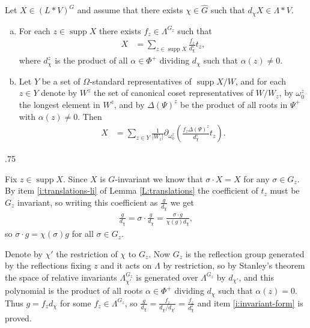 \documentclass[11pt,fleqn]{amsart}
\makeatletter
\renewcommand\proofname{Proof}
\renewenvironment{proof}[1][\textit{\proofname}]{\par
 \pushQED{\qed}%
 \normalfont \topsep.75\paraskip\relax
 \trivlist
 \item[\hskip\labelsep
 \itshape
 #1\@addpunct{.}]\ignorespaces
}{%
 \popQED\endtrivlist\@endpefalse
}
\newcounter{para}[section]
\DeclareMathOperator\supp{supp}
\makeatother
\begin{document}
\begin{Proposition}
\label{P:form}
Let $X \in (L*V)^G$ and assume that there exists $\chi \in \hat G$ such that 
$d_\chi X \in \Lambda * V$. 
\begin{enumerate}[(a)]
\item 
\label{i:invariant-form}
For each $z \in \supp X$ there exists $f_z \in \Lambda^{G_z}$ such that
\begin{align*}
X
	&= \sum_{z \in \supp X} \frac{f_z}{d_{\chi}^z} t_z,
\end{align*}
where $d_{\chi}^z$ is the product of all $\alpha \in \Phi^+$ dividing $d_\chi$ 
such that $\alpha(z) \neq 0$. 

\item
\label{i:dd-form}
Let $Y$ be a set of $\Omega$-standard representatives of $\supp X / W$, and 
for each $z \in Y$ denote by $W^z$ the set of canonical coset representatives 
of $W/W_z$, by $\omega_0^z$ the longest element in $W^z$, and by 
$\Delta(\Psi)^z$ be the product of all roots in $\Psi^+$ with $\alpha(z) 
\neq 0$. Then 
\begin{align*}
X
	&= \sum_{z \in Y} \frac{1}{|W_z|}
		\partial_{\omega_0^{z}}\left(
			\frac{f_z \Delta(\Psi)^z}{d_{\chi}^z} t_z
		\right).
\end{align*}
\end{enumerate}
\begin{proof}
Fix $z \in \supp X$. Since $X$ is $G$-invariant we know that $\sigma \cdot X = 
X$ for any $\sigma \in G_z$. By item \ref{i:translations-li} of Lemma
\ref{L:translations} the coefficient of $t_z$ must be $G_z$ invariant, so 
writing this coefficient as $\frac{g}{d_\chi}$ we get
\begin{align*}
\frac{g}{d_\chi} 
	= \sigma \cdot \frac{g}{d_\chi} 
	=\frac{\sigma \cdot g}{\chi(g) d_\chi},
\end{align*}
so $\sigma \cdot g = \chi(\sigma) g$ for all $\sigma \in G_z$. 

Denote by $\chi'$ the restriction of $\chi$ to $G_z$. Now $G_z$ is the 
reflection group generated by the reflections fixing $z$ and it acts on 
$\Lambda$ by restriction, so by Stanley's theorem the space of relative 
invariants $\Lambda^{G_z}_{\chi'}$ is generated over $\Lambda^{G_z}$ by 
$d_{\chi'}$, and this polynomial is the product of all roots $\alpha \in 
\Phi^+$ dividing $d_\chi$ such that $\alpha(z) = 0$. Thus $g = f_z d_{\chi}$
for some $f_z \in \Lambda^{G_z}$, so $\frac{g}{d_{\chi}} = 
\frac{f_z}{d_\chi/d_{\chi'}} = \frac{f_z}{d_{\chi}^z}$ and item 
\ref{i:invariant-form} is proved. 


\end{proof}
\end{Proposition}
\end{document}
